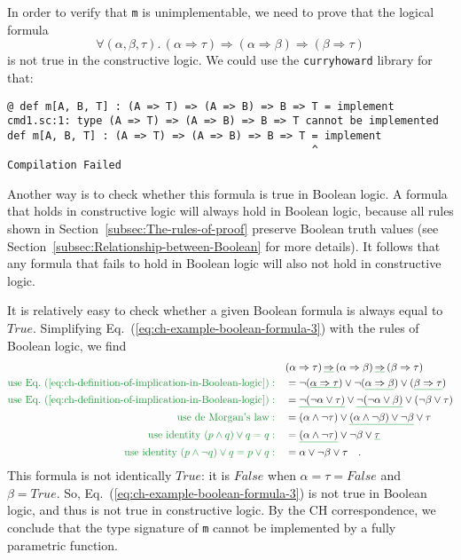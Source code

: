In order to verify that \lstinline!m! is unimplementable, we need
to prove that the logical formula
\begin{equation}
\forall(\alpha,\beta,\tau).\,(\alpha\Rightarrow\tau)\Rightarrow(\alpha\Rightarrow\beta)\Rightarrow(\beta\Rightarrow\tau)\label{eq:ch-example-boolean-formula-3}
\end{equation}
is not true in the constructive logic. We could use the \texttt{curryhoward}
library for that:
\begin{lstlisting}
@ def m[A, B, T] : (A => T) => (A => B) => B => T = implement
cmd1.sc:1: type (A => T) => (A => B) => B => T cannot be implemented
def m[A, B, T] : (A => T) => (A => B) => B => T = implement
                                                ^
Compilation Failed
\end{lstlisting}
Another way is to check whether this formula is true in Boolean logic.
A formula that holds in constructive logic will always hold in Boolean
logic, because all rules shown in Section~\ref{subsec:The-rules-of-proof}
preserve Boolean truth values (see Section~\ref{subsec:Relationship-between-Boolean}
for more details). It follows that any formula that fails to hold
in Boolean logic will also not hold in constructive logic. 

It is relatively easy to check whether a given Boolean formula is
always equal to $True$. Simplifying Eq.~(\ref{eq:ch-example-boolean-formula-3})
with the rules of Boolean logic, we find
\begin{align*}
 & (\alpha\Rightarrow\tau)\,\gunderline{\Rightarrow}\,(\alpha\Rightarrow\beta)\,\gunderline{\Rightarrow}\,(\beta\Rightarrow\tau)\\
{\color{greenunder}\text{use Eq.~(\ref{eq:ch-definition-of-implication-in-Boolean-logic})}:}\quad & =\neg(\gunderline{\alpha\Rightarrow\tau})\vee\neg(\gunderline{\alpha\Rightarrow\beta})\vee(\gunderline{\beta\Rightarrow\tau})\\
{\color{greenunder}\text{use Eq.~(\ref{eq:ch-definition-of-implication-in-Boolean-logic})}:}\quad & =\gunderline{\neg(\neg\alpha\vee\tau)}\vee\gunderline{\neg(\neg\alpha\vee\beta)}\vee(\neg\beta\vee\tau)\\
{\color{greenunder}\text{use de Morgan's law}:}\quad & =\left(\alpha\wedge\neg\tau\right)\vee\gunderline{\left(\alpha\wedge\neg\beta\right)\vee\neg\beta}\vee\tau\\
{\color{greenunder}\text{use identity }(p\wedge q)\vee q=q:}\quad & =\gunderline{\left(\alpha\wedge\neg\tau\right)}\vee\neg\beta\vee\gunderline{\tau}\\
{\color{greenunder}\text{use identity }(p\wedge\neg q)\vee q=p\vee q:}\quad & =\alpha\vee\neg\beta\vee\tau\quad.
\end{align*}
This formula is not identically $True$: it is $False$ when $\alpha=\tau=False$
and $\beta=True$. So, Eq.~(\ref{eq:ch-example-boolean-formula-3})
is not true in Boolean logic, and thus is not true in constructive
logic. By the CH correspondence, we conclude that the type signature
of \lstinline!m! cannot be implemented by a fully parametric function.

